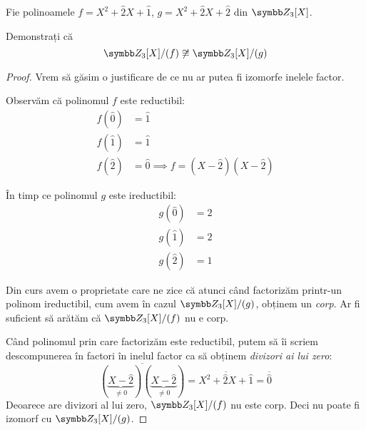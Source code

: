 \begin{exercise}
Fie polinoamele \(f = X^2 + \widehat{2} X + \widehat{1}\), \(g = X^2 + \widehat{2} X + \widehat{2}\) din \(\integersmod{3}[X]\).

Demonstrați că
\[
    \integersmod{3}[X] / (f) \not\cong \integersmod{3}[X] / (g)
\]
\end{exercise}
\begin{proof}
Vrem să găsim o justificare de ce nu ar putea fi izomorfe inelele factor.

Observăm că polinomul \(f\) este reductibil:
\begin{align*}
    f(\widehat{0}) &= \widehat{1} \\
    f(\widehat{1}) &= \widehat{1} \\
    f(\widehat{2}) &= \widehat{0}
    \implies f = (X - \widehat{2})(X - \widehat{2})
\end{align*}

În timp ce polinomul \(g\) este ireductibil:
\begin{align*}
    g(\widehat{0}) &= \widehat{2} \\
    g(\widehat{1}) &= \widehat{2} \\
    g(\widehat{2}) &= \widehat{1}
\end{align*}

Din curs avem o proprietate care ne zice că atunci când factorizăm printr-un polinom ireductibil, cum avem în cazul \(\integersmod{3}[X]/(g)\), obținem un \emph{corp}. Ar fi suficient să arătăm că \(\integersmod{3}[X]/(f)\) nu e corp.

Când polinomul prin care factorizăm este reductibil, putem să îi scriem descompunerea în factori în inelul factor ca să obținem \emph{divizori ai lui zero}:
\[
    \overline{(\underbrace{X - \widehat{2}}_{\neq 0})(\underbrace{X - \widehat{2}}_{\neq 0})} = \overline{X^2 + \widehat{2} X + \widehat{1}} = \overline{\widehat{0}}
\]
Deoarece are divizori al lui zero, \(\integersmod{3}[X]/(f)\) nu este corp. Deci nu poate fi izomorf cu \(\integersmod{3}[X]/(g)\).
\end{proof}

